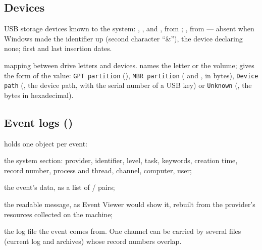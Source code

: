 \documentclass[11pt,a4paper,oneside]{report}
\begin{document}
\subsection{Devices}

\begin{description}[style=nextline,leftmargin=1.2em]
  \item[\fichier{Usbstor.json}] USB storage devices known to the system:
        , ,  and ,
        from ; , from 
        — absent when Windows made the identifier up (second character
        ``\&''), the device declaring none; first and last insertion dates.
  \item[\fichier{mounted\_device.json}] mapping between drive letters and
        devices.  names the letter or the volume; 
        gives the form of the value: \texttt{GPT partition}
        (), \texttt{MBR partition}
        ( and , in bytes),
        \texttt{Device path} (, the device path, with the serial
        number of a USB key) or \texttt{Unknown} (, the bytes in
        hexadecimal).
\end{description}

\subsection{Event logs ()}

 holds one object per event:

\begin{description}[style=nextline,leftmargin=1.2em]
  \item[\champ{EvtSystem*}] the system section: provider, identifier, level,
        task, keywords, creation time, record number, process and thread,
        channel, computer, user;
  \item[\champ{EvtEventData}] the event's data, as a list of  /
         pairs;
  \item[\champ{EvtEventMessage}] the readable message, as Event Viewer would show
        it, rebuilt from the provider's resources collected on the machine;
  \item[\champ{EvtSourceLog}] the log file the event comes from. One channel can
        be carried by several files (current log and archives) whose record
        numbers overlap.
\end{description}
\end{document}
